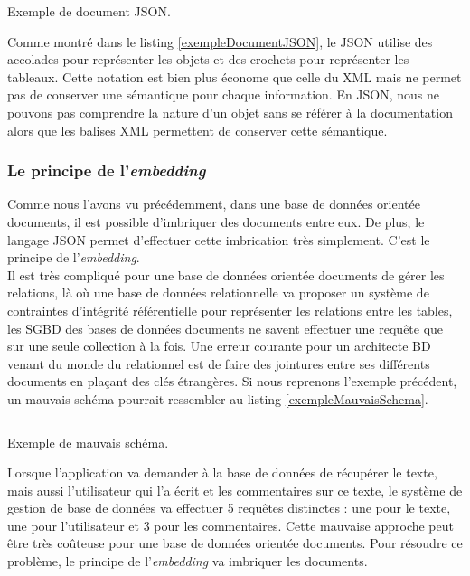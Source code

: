 	\begin{listing}[H]
		\inputminted{json}{code/exemple.json}
		\caption{Exemple de document JSON.}
		\label{exempleDocumentJSON}
	\end{listing}

	Comme montré dans le listing \ref{exempleDocumentJSON}, le JSON utilise des accolades pour représenter les objets et des crochets pour représenter les tableaux. Cette notation est bien plus économe que celle du XML mais ne permet pas de conserver une sémantique pour chaque information. En JSON, nous ne pouvons pas comprendre la nature d'un objet sans se référer à la documentation alors que les balises XML permettent de conserver cette sémantique.

	\subsubsection{Le principe de l'\textit{embedding}}

	Comme nous l'avons vu précédemment, dans une base de données orientée documents, il est possible d'imbriquer des documents entre eux. De plus, le langage JSON permet d'effectuer cette imbrication très simplement. C'est le principe de l'\textit{embedding}.\\

	Il est très compliqué pour une base de données orientée documents de gérer les relations, là où une base de données relationnelle va proposer un système de contraintes d'intégrité référentielle pour représenter les relations entre les tables, les SGBD des bases de données documents ne savent effectuer une requête que sur une seule collection à la fois. Une erreur courante pour un architecte BD venant du monde du relationnel est de faire des jointures entre ses différents documents en plaçant des clés étrangères. Si nous reprenons l'exemple précédent, un mauvais schéma pourrait ressembler au listing \ref{exempleMauvaisSchema}.

	\begin{listing}[H]
		\inputminted{json}{code/duplicationClesPrimairesLivres.json}
		\caption{Exemple de mauvais schéma.}
		\label{exempleMauvaisSchema}
	\end{listing}

	Lorsque l'application va demander à la base de données de récupérer le texte, mais aussi l'utilisateur qui l'a écrit et les commentaires sur ce texte, le système de gestion de base de données va effectuer 5 requêtes distinctes : une pour le texte, une pour l'utilisateur et 3 pour les commentaires. Cette mauvaise approche peut être très coûteuse pour une base de données orientée documents. Pour résoudre ce problème, le principe de l'\textit{embedding} va imbriquer les documents.\\

